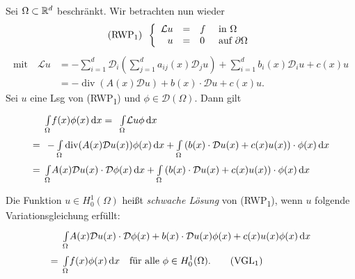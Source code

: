 \documentclass{cheat-sheet}
\newcommand{\bOmega}{\partial \Omega} %
\newcommand{\LL}{\mathcal{L}} %
\DeclareMathOperator{\dive}{div} %
\newcommand{\tss}[1]{\textsubscript{#1}} %
\newcommand{\DO}{\mathcal{D}} %
\newcommand{\Testfun}{\mathcal{D}} %
\begin{document}
\begin{situation}
  Sei $\Omega \subset \mathbb{R}^d$ beschränkt.
  Wir betrachten nun wieder
  \[
    \text{(RWP\tss{1})} \enspace \left\{ \begin{array}{rlll}
      \LL u &=& f &\text{ in $\Omega$} \\
      u &=& 0 &\text{ auf $\bOmega$}
    \end{array} \right.
  \]
  \begin{align*}
    \text{mit} \quad
    \LL u & = - \sum_{i=1}^d \DO_i (\sum_{j=1}^d a_{ij}(x) \DO_j u) + \sum_{i=1}^d b_i(x) \DO_i u + c(x) u \\
    & = - \dive(A(x) \DO u) + b(x) \cdot \DO u + c(x) u.
  \end{align*}
  Sei $u$ eine Lsg von (RWP\tss{1}) und $\phi \in \Testfun(\Omega)$.
  Dann gilt
  \begin{align*}
    & \enspace \Int{\Omega}{}{f(x) \phi(x)}{x}
    = \enspace \Int{\Omega}{}{\LL u \phi}{x} \\
    = & \enspace - \Int{\Omega}{}{\dive(A(x) \DO u(x)) \phi(x)}{x} + \Int{\Omega}{}{\left( b(x) \cdot \DO u(x) + c(x) u(x) \right) \cdot \phi(x)}{x} \\
    = & \enspace \Int{\Omega}{}{A(x) \DO u(x) \cdot \DO \phi(x)}{x} + \Int{\Omega}{}{\left( b(x) \cdot \DO u(x) + c(x) u(x) \right) \cdot \phi(x)}{x}
  \end{align*}

  \iffalse
  Nebenrechnung:
  \begin{align*}
    & - \Int{\Omega}{}{\sum_i \DO_i (\sum_j a_{ij}(x) \DO_j u(x) \phi(x))}{x} \\
    = & - \Int{\partial \Omega}{}{\sum_i (\sum_j a_{ij}(x) \DO_j u(x)) \eta_i(x) \phi(x)}{s(x)} \\
    & + \Int{\Omega}{}{\sum_i (\sum_j a_{ij}(x) \DO_j u(x)) \DO_i \phi(x)}{x} \\
    = & \Int{\Omega}{}{A(x) \DO u(x) \cdot \DO \phi(x)}{x}
  \end{align*}
  \fi
\end{situation}


\begin{defn}
  Die Funktion $u \in H_0^1(\Omega)$ heißt \emph{schwache Lösung} von (RWP\tss{1}), wenn $u$ folgende Variationsgleichung erfüllt:
  \begin{align*}
    & \Int{\Omega}{}{A(x) \DO u(x) \cdot \DO \phi(x) + b(x) \cdot \DO u(x) \phi(x) + c(x) u(x) \phi(x)}{x} \\
    = \enspace & \Int{\Omega}{}{f(x) \phi(x)}{x}
    \quad \text{für alle } \phi \in H_0^1(\Omega).
    \tag{VGL\tss{1}}
  \end{align*}
\end{defn}
\end{document}
